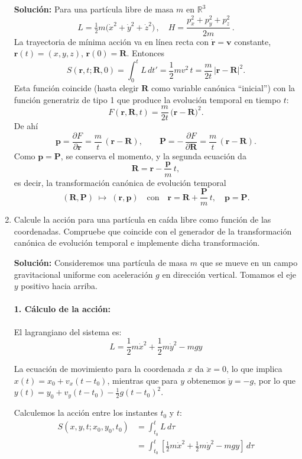 \documentclass[12pt]{article}
\begin{document}
\begin{enumerate}
  \textbf{Solución:}  
  Para una partícula libre de masa \(m\) en \(\mathbb{R}^3\)
  \[
    L = \tfrac12 m\bigl(\dot x^2+\dot y^2+\dot z^2\bigr)\,,
    \quad H=\frac{p_x^2+p_y^2+p_z^2}{2m}\,.
  \]
  La trayectoria de mínima acción va en línea recta con \(\dot{\mathbf r}=\mathbf v\) constante,
  \(\mathbf r(t)=(x,y,z)\), \(\mathbf r(0)=\mathbf R\). Entonces
  \[
    S(\mathbf r,t;\mathbf R,0)
    =\int_{0}^{t}L\,dt'
    =\frac12m v^2\,t
    =\frac{m}{2t}\,\bigl|\mathbf r-\mathbf R\bigr|^2.
  \]
  Esta función coincide (hasta elegir \(\mathbf R\) como variable canónica “inicial”)
  con la función generatriz de tipo 1 que produce la evolución temporal en tiempo \(t\):
  \[
    F(\mathbf r,\mathbf R,t)
    =\frac m{2t}\,\bigl(\mathbf r-\mathbf R\bigr)^2.
  \]
  De ahí
  \[
    \mathbf p
    =\frac{\partial F}{\partial \mathbf r}
    =\frac{m}{t}\,(\mathbf r-\mathbf R),
    \qquad
    \mathbf P
    =-\,\frac{\partial F}{\partial \mathbf R}
    =\frac{m}{t}\,(\mathbf r-\mathbf R).
  \]
  Como \(\mathbf p=\mathbf P\), se conserva el momento, y la segunda ecuación da
  \[
    \mathbf R
    =\mathbf r - \frac{\mathbf p}{m}\,t,
  \]
  es decir, la transformación canónica de evolución temporal
  \[
    (\mathbf R,\mathbf P)\;\longmapsto\;(\mathbf r,\mathbf p)
    \quad\text{con}\quad
    \mathbf r=\mathbf R+\frac{\mathbf P}{m}\,t,\quad
    \mathbf p=\mathbf P.
  \]
  \item Calcule la acción para una partícula en caída libre como función de las coordenadas. Compruebe que coincide con el generador de la transformación canónica de evolución temporal e implemente dicha transformación.
  
  \textbf{Solución:}
  Consideremos una partícula de masa $m$ que se mueve en un campo gravitacional uniforme con aceleración $g$ en dirección vertical. Tomamos el eje $y$ positivo hacia arriba.

  \paragraph{1. Cálculo de la acción:}

  El lagrangiano del sistema es:
  \[
  L = \frac{1}{2}m\dot{x}^2 + \frac{1}{2}m\dot{y}^2 - mgy
  \]

  La ecuación de movimiento para la coordenada $x$ da $\ddot{x}=0$, lo que implica $x(t) = x_0 + v_x(t-t_0)$, mientras que para $y$ obtenemos $\ddot{y}=-g$, por lo que $y(t) = y_0 + v_y(t-t_0) - \frac{1}{2}g(t-t_0)^2$.

  Calculemos la acción entre los instantes $t_0$ y $t$:
  \begin{align}
  S(x,y,t;x_0,y_0,t_0) &= \int_{t_0}^{t} L\,d\tau \\
  &= \int_{t_0}^{t} \left[\frac{1}{2}m\dot{x}^2 + \frac{1}{2}m\dot{y}^2 - mgy\right]\,d\tau
  \end{align}


\end{enumerate}
\end{document}
